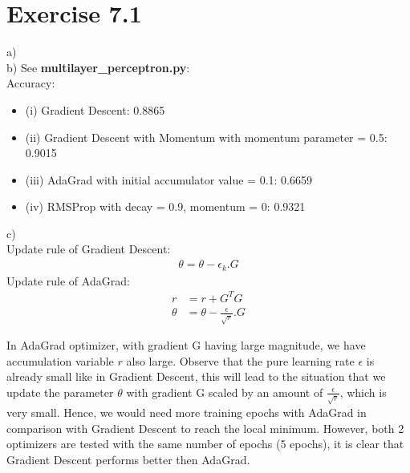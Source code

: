 \documentclass{article}
\begin{document}
\section*{Exercise 7.1}
a)\\
b) See \textbf{multilayer\_perceptron.py}:\\
Accuracy:
\begin{itemize}
\item (i) Gradient Descent: 0.8865
\item (ii) Gradient Descent with Momentum with momentum parameter = 0.5: 0.9015
\item (iii) AdaGrad with initial accumulator value = 0.1: 0.6659
\item (iv) RMSProp with decay = 0.9, momentum = 0: 0.9321
\end{itemize}
c)\\
Update rule of Gradient Descent:
\begin{align*}
\theta = \theta - \epsilon_{k}.G
\end{align*}
Update rule of AdaGrad:
\begin{align*}
r &= r + G^TG\\
\theta &= \theta - \frac{\epsilon}{\sqrt{r}}.G
\end{align*}

In AdaGrad optimizer, with gradient G having large magnitude, we have accumulation variable $r$ also large. Observe that the pure learning rate $\epsilon$ is already small like in Gradient Descent, this will lead to the situation that we update the parameter $\theta$ with gradient G scaled by an amount of $\frac{\epsilon}{\sqrt{r}}$, which is very small. Hence, we would need more training epochs with AdaGrad in comparison with Gradient Descent to reach the local minimum. However, both 2 optimizers are tested with the same number of epochs (5 epochs), it is clear that Gradient Descent performs better then AdaGrad.
\end{document}
